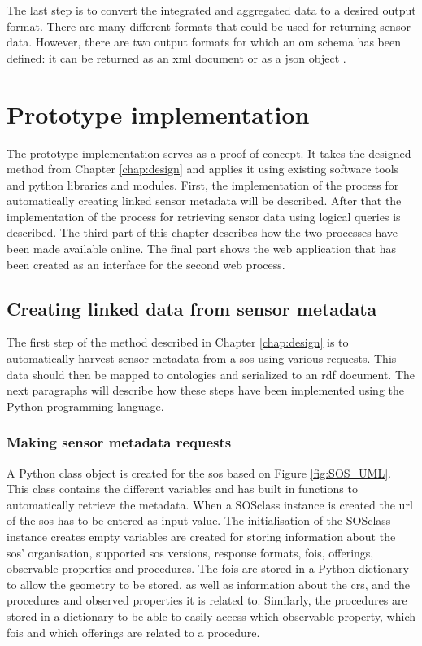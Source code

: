 The last step is to convert the integrated and aggregated data to a desired output format. There are many different formats that could be used for returning sensor data. However, there are two output formats for which an \ac{om} schema has been defined: it can be returned as an \ac{xml} document \citep{SW:ISO} or as a \ac{json} object \citep{SW:OGC6}.  


\chapter{Prototype implementation}
\label{chap:impl}
The prototype implementation serves as a proof of concept. It takes the designed method from Chapter \ref{chap:design} and applies it using existing software tools and python libraries and modules. First, the implementation of the process for automatically creating linked sensor metadata will be described. After that the implementation of the process for retrieving sensor data using logical queries is described. The third part of this chapter describes how the two processes have been made available online. The final part shows the web application that has been created as an interface for the second web process.



\section{Creating linked data from sensor metadata}
\label{par:linkedSD}
The first step of the method described in Chapter \ref{chap:design} is to automatically harvest sensor metadata from a \ac{sos} using various requests. This data should then be mapped to ontologies and serialized to an \ac{rdf} document. The next paragraphs will describe how these steps have been implemented using the Python programming language.

\subsection{Making sensor metadata requests}
A Python class object is created for the \ac{sos} based on Figure \ref{fig:SOS_UML}. This class contains the different variables and has built in functions to automatically retrieve the metadata. When a SOSclass instance is created the \ac{url} of the \ac{sos} has to be entered as input value. The initialisation of the SOSclass instance creates empty variables are created for storing information about the \ac{sos}' organisation, supported \ac{sos} versions, response formats, \acp{foi}, offerings, observable properties and procedures. The \acp{foi} are stored in a Python dictionary to allow the geometry to be stored, as well as information about the \ac{crs}, and the procedures and observed properties it is related to. Similarly, the procedures are stored in a dictionary to be able to easily access which observable property, which \acp{foi} and which offerings are related to a procedure.

